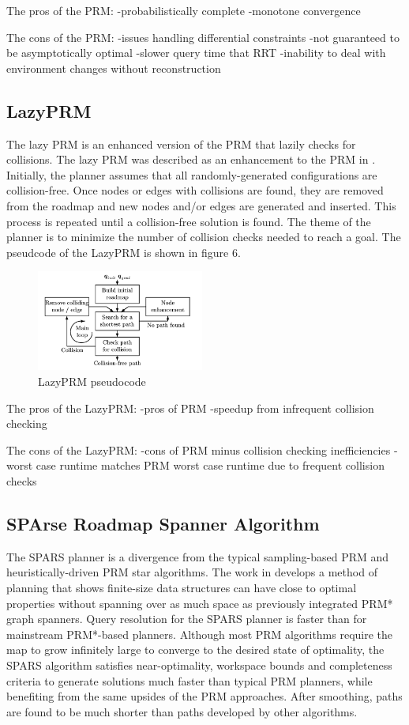 \documentclass[conference]{IEEEtran} \usepackage[T1]{fontenc} \usepackage[backend=biber, style=ieee]{biblatex}
\begin{document}
The pros of the PRM:
-probabilistically complete
-monotone convergence

The cons of the PRM:
-issues handling differential constraints
-not guaranteed to be asymptotically optimal
-slower query time that RRT
-inability to deal with environment changes without reconstruction

\subsection{LazyPRM} \label{LazyPRM}
The lazy PRM is an enhanced version of the PRM that lazily checks for collisions. The lazy PRM was described as an enhancement to the PRM in \cite{lazy_prm}. Initially, 
the planner assumes that all randomly-generated configurations are collision-free. Once nodes or edges with collisions are found, they are removed from the roadmap and
new nodes and/or edges are generated and inserted. This process is repeated until a collision-free solution is found. The theme of the planner is to minimize the number
of collision checks needed to reach a goal. The pseudcode of the LazyPRM is shown in figure 6.

\begin{figure}
\label{figure6} 
\centering 
\includegraphics[width=0.49\textwidth]{lazy_prm}
\caption{LazyPRM pseudocode}
\end{figure}

The pros of the LazyPRM:
-pros of PRM
-speedup from infrequent collision checking

The cons of the LazyPRM:
-cons of PRM minus collision checking inefficiencies
-worst case runtime matches PRM worst case runtime due to frequent collision checks

\subsection{SPArse Roadmap Spanner Algorithm} \label{SPARS}
The SPARS planner is a divergence from the typical sampling-based PRM and heuristically-driven PRM star algorithms. The work in \cite{spars} develops a method of planning 
that shows finite-size data structures can have close to optimal properties without spanning over as much space as previously integrated PRM* graph spanners. Query
resolution for the SPARS planner is faster than for mainstream PRM*-based planners. Although most PRM algorithms require the map to grow infinitely large to converge to 
the desired state of optimality, the SPARS algorithm satisfies near-optimality, workspace bounds and completeness criteria to generate solutions much faster than typical
PRM planners, while benefiting from the same upsides of the PRM approaches. After smoothing, paths are found to be much shorter than paths developed by other algorithms.
\end{document}
